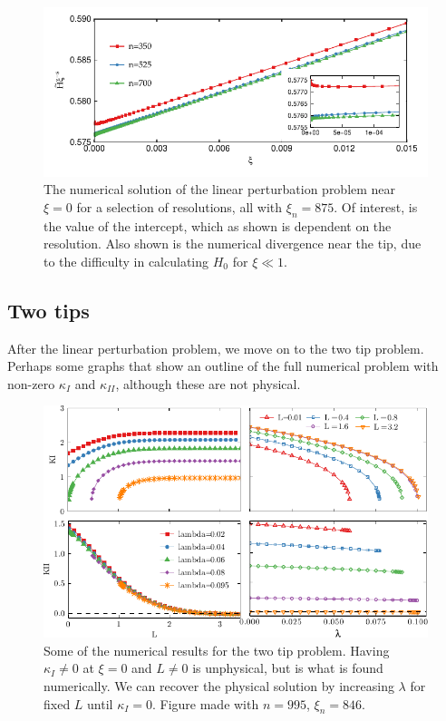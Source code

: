 \documentclass{jfm}
\begin{document}
\begin{figure}
 \centerline{
\includegraphics{./../../Graphs/linear-perturbation-plot.pdf}}
  \caption{The numerical solution of the linear perturbation problem near 
           $\xi=0$ for a selection of resolutions, all with $\xi_n = 875$. Of 
           interest, is the value of the intercept, which as shown is dependent
           on the resolution. Also shown is the numerical divergence near the 
           tip, due to the difficulty in calculating $H_0$ for $\xi \ll 1$.
           }\label{fig:lin-pert}
\end{figure}

\subsection{Two tips}
After the linear perturbation problem, we move on to the two tip
problem. Perhaps some graphs that show an outline of the full numerical problem
with non-zero $\kappa_I$ and $\kappa_{II}$, although these are not physical.
\begin{figure}
 \centerline{
\includegraphics{./../../Graphs/KI-KII-edited.pdf}}
  \caption{Some of the numerical results for the two tip problem. Having 
           $\kappa_{I} \neq 0$ at $\xi =0$ and $L \neq 0$ is unphysical, but
           is what is found numerically. We can recover the physical solution
           by increasing $\lambda$ for fixed $L$ until $\kappa_I =0$. Figure 
           made with $n = 995$, $\xi_n = 846$.}
\end{figure}
\end{document}
